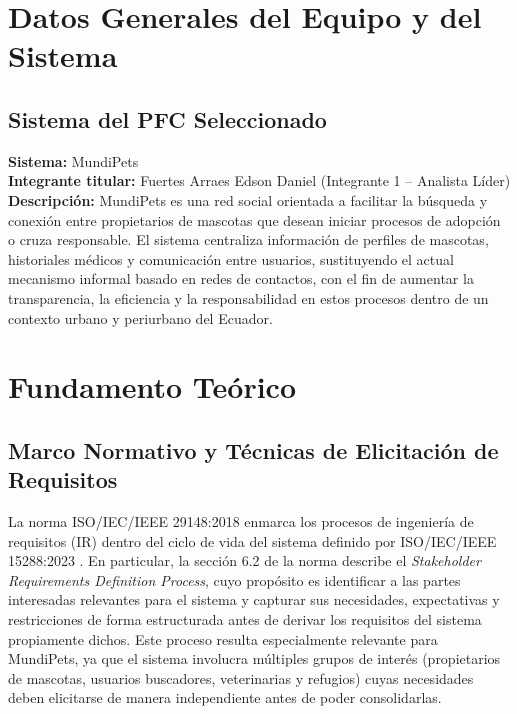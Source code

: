 \documentclass[journal,onecolumn]{IEEEtran}
\begin{document}
\tableofcontents
\newpage

\section{Datos Generales del Equipo y del Sistema}

\subsection{Sistema del PFC Seleccionado}

\textbf{Sistema:} MundiPets\\
\textbf{Integrante titular:} Fuertes Arraes Edson Daniel (Integrante 1 -- Analista Líder)\\
\textbf{Descripción:} MundiPets es una red social orientada a facilitar la búsqueda y
conexión entre propietarios de mascotas que desean iniciar procesos de adopción o
cruza responsable. El sistema centraliza información de perfiles de mascotas,
historiales médicos y comunicación entre usuarios, sustituyendo el actual mecanismo
informal basado en redes de contactos, con el fin de aumentar la transparencia,
la eficiencia y la responsabilidad en estos procesos dentro de un contexto urbano
y periurbano del Ecuador.

\newpage

\section{Fundamento Teórico}

\subsection{Marco Normativo y Técnicas de Elicitación de Requisitos}

La norma ISO/IEC/IEEE 29148:2018 \cite{iso29148} enmarca los procesos de
ingeniería de requisitos (IR) dentro del ciclo de vida del sistema definido
por ISO/IEC/IEEE 15288:2023 \cite{iso15288}. En particular, la sección 6.2
de la norma describe el \textit{Stakeholder Requirements Definition Process},
cuyo propósito es identificar a las partes interesadas relevantes para el
sistema y capturar sus necesidades, expectativas y restricciones de forma
estructurada antes de derivar los requisitos del sistema propiamente dichos.
Este proceso resulta especialmente relevante para MundiPets, ya que el
sistema involucra múltiples grupos de interés (propietarios de mascotas,
usuarios buscadores, veterinarias y refugios) cuyas necesidades deben
elicitarse de manera independiente antes de poder consolidarlas.
\end{document}
